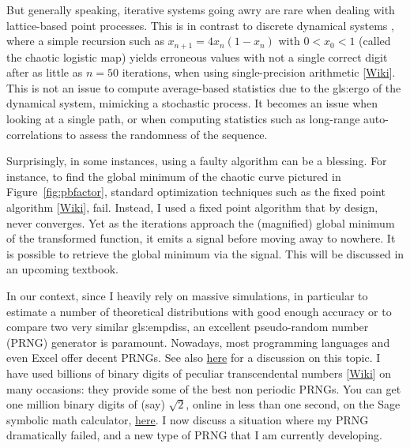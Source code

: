\documentclass[10pt]{article}
\begin{document}
But generally speaking, iterative systems going awry are rare when dealing with lattice-based point processes. This is in contrast to discrete \textcolor{index}{dynamical systems}
, where a
simple recursion such as $x_{n+1}=4x_n(1-x_n)$ with $0<x_0<1$ (called the chaotic \textcolor{index}{logistic map}) yields erroneous values with not a single correct digit after as little as $n=50$ iterations, when using single-precision arithmetic [\href{https://en.wikipedia.org/wiki/Single-precision_floating-point_format}{Wiki}]. This is not an issue to compute average-based statistics due to the \gls{gls:ergo} of the dynamical system, mimicking a stochastic process. It becomes an issue when looking at a single path, or when computing statistics such as long-range auto-correlations to assess the randomness of the sequence.

Surprisingly, in some instances, using a faulty algorithm can be a blessing. For instance, to find the global minimum of the chaotic curve pictured in Figure~\ref{fig:pbfactor}, standard optimization
techniques such as the \textcolor{index}{fixed point algorithm} [\href{https://en.wikipedia.org/wiki/Fixed-point_iteration}{Wiki}], fail. Instead, I used a fixed point algorithm that by design, never converges. Yet as the iterations approach the (magnified) global minimum of the transformed function, it emits a signal before moving away to nowhere.
It is possible to retrieve the global minimum via the signal. This will be discussed in an upcoming textbook.

In our context, since I heavily rely on massive \textcolor{index}{simulations}, in particular to estimate a number of theoretical distributions with good enough accuracy or to compare two very similar
 \glspl{gls:empdis}, an excellent \textcolor{index}{pseudo-random number} (PRNG) generator is paramount. Nowadays, most programming languages and even Excel offer decent PRNGs. See also \href{https://stackoverflow.com/questions/4720822/what-is-the-best-pseudo-random-number-generator-as-of-today}{here}
for a discussion on this topic. I have used billions of binary digits of peculiar \textcolor{index}{transcendental numbers} [\href{https://en.wikipedia.org/wiki/Transcendental_number}{Wiki}] on many occasions: they provide some of the best non periodic PRNGs.
You can get one million binary digits of (say) $\sqrt{2}$, online in less than one second, on the Sage
\textcolor{index}{symbolic math} calculator, \href{https://sagecell.sagemath.org/?z=eJzz0yguLCrRMNLUKShKTbY1NAACTb3ikiKNpMTiVFsjTQCp3gnT&lang=sage}{here}.
 I now discuss a situation where my PRNG dramatically failed, and a new type of PRNG that I am currently developing.
\end{document}
